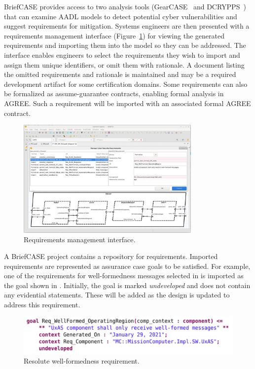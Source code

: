 BriefCASE provides access to two analysis tools (GearCASE~\cite{gearcase2020} and
DCRYPPS~\cite{dcrypps2019}) that can examine AADL models to detect potential cyber vulnerabilities
and suggest requirements for mitigation.
%
Systems engineers are then presented with a requirements management interface
(Figure~\ref{fig:req-mgmt}) for viewing the generated requirements and importing them into the model
so they can be addressed. The interface enables engineers to select the requirements they wish to
import and assign them unique identifiers, or omit them with rationale. A document listing the omitted
requirements and rationale is maintained and may be a required development artifact for some
certification domains. Some requirements can also be formalized as assume-guarantee contracts,
enabling formal analysis in AGREE. Such a requirement will be imported with an associated formal
AGREE contract.

\begin{figure}[h]
	\centering
	\includegraphics[width=0.8\textwidth]{figs/req-mgmt.png}
	\caption{Requirements management interface.} 
	\label{fig:req-mgmt} 
\end{figure}

A BriefCASE project contains a repository for requirements. Imported requirements are represented 
as assurance case goals to be satisfied. For example, one of the requirements for well-formedness 
messages selected in  is imported as the goal shown in .
Initially, the goal is marked {\em undeveloped} and does not contain any evidential statements.  
These will be added as the design is updated to address this requirement.  

\begin{figure}[h]
	\centering
	\includegraphics[width=1\columnwidth]{figs/req-wellformed-or.png}
	\caption{Resolute well-formedness requirement.} 
	\label{fig:req-wellformed-or} 
\end{figure}
